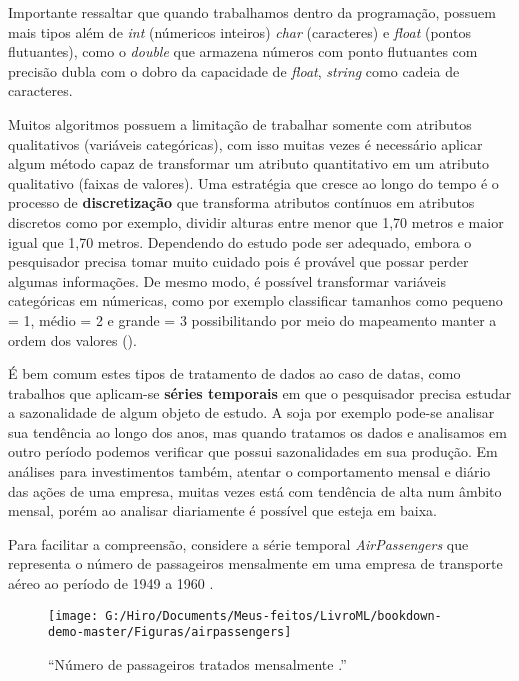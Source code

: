 \documentclass[
  openany]{book}
\begin{document}
Importante ressaltar que quando trabalhamos dentro da programação, possuem mais tipos além de \emph{int} (númericos inteiros) \emph{char} (caracteres) e \emph{float} (pontos flutuantes), como o \emph{double} que armazena números com ponto flutuantes com precisão dubla com o dobro da capacidade de \emph{float}, \emph{string} como cadeia de caracteres.

Muitos algoritmos possuem a limitação de trabalhar somente com atributos qualitativos (variáveis categóricas), com isso muitas vezes é necessário aplicar algum método capaz de transformar um atributo quantitativo em um atributo qualitativo (faixas de valores). Uma estratégia que cresce ao longo do tempo é o processo de \textbf{discretização} que transforma atributos contínuos em atributos discretos como por exemplo, dividir alturas entre menor que 1,70 metros e maior igual que 1,70 metros. Dependendo do estudo pode ser adequado, embora o pesquisador precisa tomar muito cuidado pois é provável que possar perder algumas informações. De mesmo modo, é possível transformar variáveis categóricas em númericas, como por exemplo classificar tamanhos como pequeno = 1, médio = 2 e grande = 3 possibilitando por meio do mapeamento manter a ordem dos valores (\citet{batista2003pre}).

É bem comum estes tipos de tratamento de dados ao caso de datas, como trabalhos que aplicam-se \textbf{séries temporais} em que o pesquisador precisa estudar a sazonalidade de algum objeto de estudo. A soja por exemplo pode-se analisar sua tendência ao longo dos anos, mas quando tratamos os dados e analisamos em outro período podemos verificar que possui sazonalidades em sua produção. Em análises para investimentos também, atentar o comportamento mensal e diário das ações de uma empresa, muitas vezes está com tendência de alta num âmbito mensal, porém ao analisar diariamente é possível que esteja em baixa.

Para facilitar a compreensão, considere a série temporal \emph{AirPassengers} que representa o número de passageiros mensalmente em uma empresa de transporte aéreo ao período de 1949 a 1960 \citep{box1976time}.

\begin{figure}

{\centering \texttt{[image: G:/Hiro/Documents/Meus-feitos/LivroML/bookdown-demo-master/Figuras/airpassengers]} 

}

\caption{``Número de passageiros tratados mensalmente \citep{box1976time}.''}\label{fig:airpassengers}
\end{figure}
\end{document}
